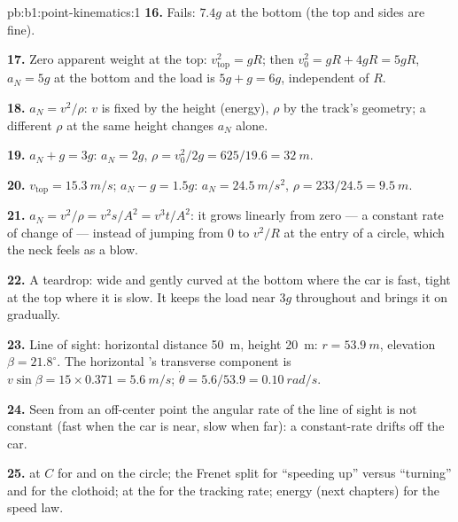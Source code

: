 \begin{solution}{pb:b1:point-kinematics:1}
\textbf{16.} Fails: $7.4g$ at the bottom (the top and sides are fine).

\textbf{17.} Zero apparent weight at the top: $v_{\text{top}}^2 = gR$;
then $v_0^2 = gR + 4gR = 5gR$, $a_N = 5g$ at the bottom and the load is
$5g + g = 6g$, independent of $R$.

\textbf{18.} $a_N = v^2/\rho$: $v$ is fixed by the height (energy), $\rho$
by the track's geometry; a different $\rho$ at the same height changes
$a_N$ alone.

\textbf{19.} $a_N + g = 3g$: $a_N = 2g$, $\rho = v_0^2/2g = 625/19.6 =
\qty{32}{m}$.

\textbf{20.} $v_{\text{top}} = \qty{15.3}{m/s}$; $a_N - g = 1.5g$: $a_N =
\qty{24.5}{m/s^2}$, $\rho = 233/24.5 = \qty{9.5}{m}$.

\textbf{21.} $a_N = v^2/\rho = v^2s/A^2 = v^3t/A^2$: it grows linearly
from zero --- a constant rate of change of  --- instead of
jumping from $0$ to $v^2/R$ at the entry of a circle, which the neck
feels as a blow.

\textbf{22.} A teardrop: wide and gently curved at the bottom where the
car is fast, tight at the top where it is slow. It keeps the load near
$3g$ throughout and brings it on gradually.

\textbf{23.} Line of sight: horizontal distance \qty{50}{m}, height
\qty{20}{m}: $r = \qty{53.9}{m}$, elevation $\beta = 21.8^\circ$. The
horizontal 's transverse component is $v\sin\beta = 15 \times
0.371 = \qty{5.6}{m/s}$; $\dot\theta = 5.6/53.9 = \qty{0.10}{rad/s}$.

\textbf{24.} Seen from an off-center point the angular rate of the line
of sight is not constant (fast when the car is near, slow when far):
a constant-rate  drifts off the car.

\textbf{25.}  at $C$ for  and  on
the circle; the Frenet split for ``speeding up'' versus ``turning'' and
for the clothoid;  at the  for the tracking
rate; energy (next chapters) for the speed law.
\end{solution}
